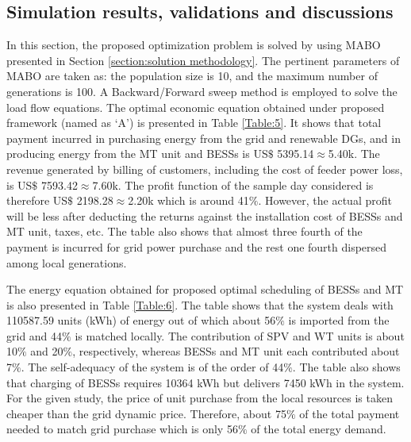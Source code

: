 \documentclass[journal]{IEEEtran}
\begin{document}
 \subsection{Simulation results, validations and discussions}
 In this section, the proposed optimization problem is solved by using MABO presented in Section \ref{section:solution methodology}. The pertinent parameters of MABO are taken as: the population size is 10, and the maximum number of generations is 100. A Backward/Forward sweep method is employed to solve the load flow equations. The optimal economic equation obtained under proposed framework (named as `A') is presented in Table \ref{Table:5}. It shows that total payment incurred in purchasing energy from the grid and renewable DGs, and in producing energy from the MT unit and BESSs is US$\$$ 5395.14$\approx$5.40k. The revenue generated by billing of customers, including the cost of feeder power loss, is US$\$$ 7593.42$\approx$7.60k. The profit function of the sample day considered is therefore US$\$$ 2198.28$\approx$2.20k which is around 41$\%$. However, the actual profit will be less after deducting the returns against the installation cost of BESSs and MT unit, taxes, etc. The table also shows that almost three fourth of the payment is incurred for grid power purchase and the rest one fourth dispersed among local generations.
    \par The energy equation obtained for proposed optimal scheduling of BESSs and MT is also presented in Table \ref{Table:6}. The table shows that the system deals with 110587.59 units (kWh) of energy out of which about 56$\%$ is imported from the grid and 44$\%$ is matched locally. The contribution of SPV and WT units is about 10$\%$ and 20$\%$, respectively, whereas BESSs and MT unit each contributed about 7$\%$. The self-adequacy of the system is of the order of 44$\%$. The table also shows that charging of BESSs requires 10364 kWh but delivers 7450 kWh in the system. For the given study, the price of unit purchase from the local resources is taken cheaper than the grid dynamic price. Therefore, about 75$\%$ of the total payment needed to match grid purchase which is only 56$\%$ of the total energy demand.
\end{document}

